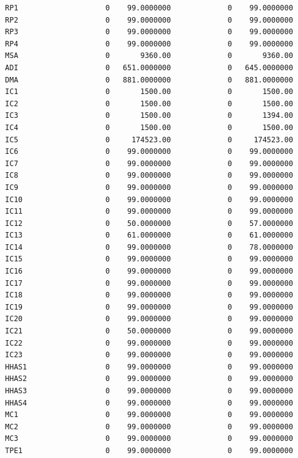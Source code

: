 \documentclass[
  11pt,
  a4paper,
  DIV=12,captions=tableheading,oneside,titlepage]{scrbook}
\begin{document}
\begin{verbatim}
  RP1                    0    99.0000000             0    99.0000000 
  RP2                    0    99.0000000             0    99.0000000 
  RP3                    0    99.0000000             0    99.0000000 
  RP4                    0    99.0000000             0    99.0000000 
  MSA                    0       9360.00             0       9360.00 
  ADI                    0   651.0000000             0   645.0000000 
  DMA                    0   881.0000000             0   881.0000000 
  IC1                    0       1500.00             0       1500.00 
  IC2                    0       1500.00             0       1500.00 
  IC3                    0       1500.00             0       1394.00 
  IC4                    0       1500.00             0       1500.00 
  IC5                    0     174523.00             0     174523.00 
  IC6                    0    99.0000000             0    99.0000000 
  IC7                    0    99.0000000             0    99.0000000 
  IC8                    0    99.0000000             0    99.0000000 
  IC9                    0    99.0000000             0    99.0000000 
  IC10                   0    99.0000000             0    99.0000000 
  IC11                   0    99.0000000             0    99.0000000 
  IC12                   0    50.0000000             0    57.0000000 
  IC13                   0    61.0000000             0    61.0000000 
  IC14                   0    99.0000000             0    78.0000000 
  IC15                   0    99.0000000             0    99.0000000 
  IC16                   0    99.0000000             0    99.0000000 
  IC17                   0    99.0000000             0    99.0000000 
  IC18                   0    99.0000000             0    99.0000000 
  IC19                   0    99.0000000             0    99.0000000 
  IC20                   0    99.0000000             0    99.0000000 
  IC21                   0    50.0000000             0    99.0000000 
  IC22                   0    99.0000000             0    99.0000000 
  IC23                   0    99.0000000             0    99.0000000 
  HHAS1                  0    99.0000000             0    99.0000000 
  HHAS2                  0    99.0000000             0    99.0000000 
  HHAS3                  0    99.0000000             0    99.0000000 
  HHAS4                  0    99.0000000             0    99.0000000 
  MC1                    0    99.0000000             0    99.0000000 
  MC2                    0    99.0000000             0    99.0000000 
  MC3                    0    99.0000000             0    99.0000000 
  TPE1                   0    99.0000000             0    99.0000000 

\end{verbatim}
\end{document}

